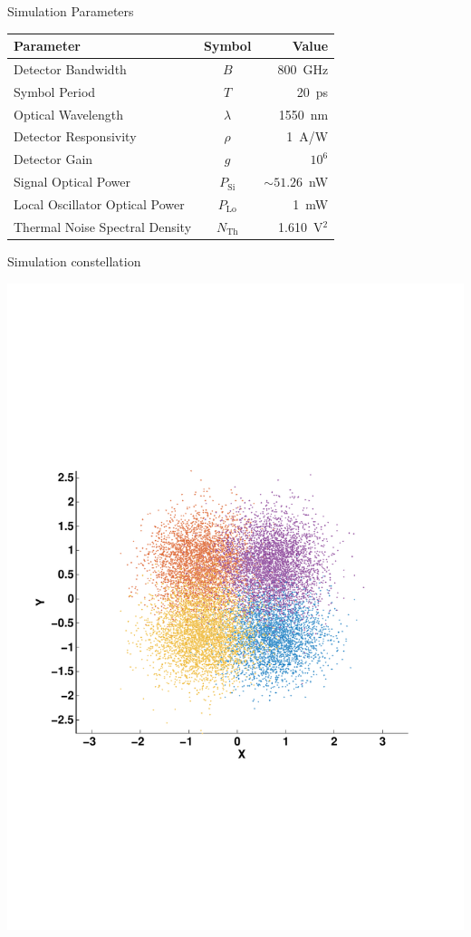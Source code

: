 \documentclass{beamer}
\begin{document}
\begin{frame}[t]{Simulation Parameters}
\begin{table}[H]
\centering
\begin{tabular}{|l|c|r|}
\hline
\textbf{Parameter}             & \textbf{Symbol} & \textbf{Value} \\ \hline
Detector Bandwidth             & $B$             & 800~GHz        \\ \hline
Symbol Period                  & $T$             & 20~ps          \\ \hline
Optical Wavelength             & $\lambda$       & 1550~nm        \\ \hline
Detector Responsivity          & $\rho$          & 1~A/W          \\ \hline
Detector Gain                  & $g$             & $10^6$         \\ \hline
Signal Optical Power           & $P_\text{Si}$   & $\sim51.26$~nW \\ \hline
Local Oscillator Optical Power & $P_\text{Lo}$   & 1~mW           \\ \hline
Thermal Noise Spectral Density & $N_\text{Th}$   & 1.610~V$^2$    \\ \hline
\end{tabular}
\end{table}
\end{frame}

\begin{frame}[t]{Simulation constellation}
\begin{center}
\includegraphics[width=.5\linewidth, trim={1cm 7cm 1.5cm 7.5cm}, clip=true]{constellationSimulation.pdf}
\end{center}
\end{frame}
\end{document}
